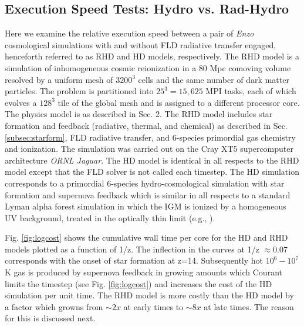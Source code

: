 \subsection{Execution Speed Tests: Hydro vs. Rad-Hydro}
\label{subsec:speed}

Here we examine the relative execution speed between a pair of {\em Enzo} cosmological simulations with and without
FLD radiative transfer engaged, henceforth referred to as RHD and HD models, respectively. The RHD model is a simulation of
inhomogeneous cosmic reionization in a 80 Mpc comoving volume resolved by a uniform mesh of $3200^3$ cells and the same
number of dark matter particles. The problem is partitioned into $25^3 = 15,625$ MPI tasks, each of which evolves
a $128^3$ tile of the global mesh and is assigned to a different processor core. The physics model is as described in Sec. 2. 
The RHD model includes star formation and feedback (radiative, thermal, and chemical) as described in Sec. \ref{subsec:starform},
FLD radiative transfer, and 6-species primordial gas chemistry and ionization. 
The simulation was
carried out on the Cray XT5 supercomputer architecture {\em ORNL Jaguar}. The HD model is identical in all 
respects to the RHD model except that the FLD solver is not called each timestep. The HD simulation corresponds
to a primordial  6-species hydro-cosmological simulation with star formation and supernova feedback which is similar in
all respects to a standard Lyman alpha forest simulation in which the IGM is ionized by a homogeneous UV 
background, treated in the optically thin limit (e.g., \citet{Jena05}). 

Fig. \ref{fig:logcost} shows the cumulative wall time per core for the HD and RHD models plotted as a function of 1/z. 
The inflection in the curves at 1/z $\approx 0.07$ corresponds with the onset of star formation at z=14. Subsequently 
hot $10^6-10^7$ K gas is produced by supernova feedback in growing amounts which Courant limits the timestep (see Fig. \ref{fig:logcost})
and increases the cost of the HD simulation per unit time. The RHD model is more costly
than the HD model by a factor which growns from $\sim 2x$ at early times to $\sim 8x$ at late times. The reason for this
is discussed next. 

